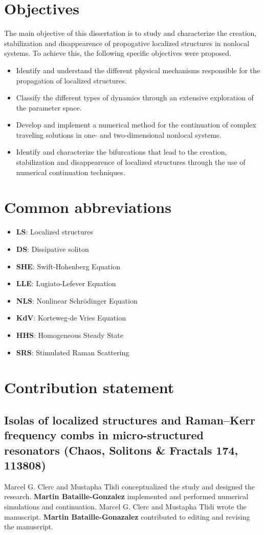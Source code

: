 \section{Objectives}
The main objective of this dissertation is to study and characterize the creation, stabilization and disappearence
of propogative localized structures in nonlocal systems. To achieve this, the following specific objectives were proposed.
\begin{itemize}
  \item Identify and understand the different physical mechanisms responsible for the propagation of
  localized structures.
  \item Classify the different types of dynamics through an extensive exploration of the parameter space.
  \item Develop and implement a numerical method for the continuation of complex traveling solutions in
  one- and two-dimensional nonlocal systems.
  \item Identify and characterize the bifurcations that lead to the creation, stabilization and disappearence 
  of localized structures through the use of numerical continuation techniques.
\end{itemize}

\section{Common abbreviations}

\begin{itemize}
  \item {\bf LS}: Localized structures
  \item {\bf DS}: Dissipative soliton
  \item {\bf SHE}: Swift-Hohenberg Equation
  \item {\bf LLE}: Lugiato-Lefever Equation
  \item {\bf NLS}: Nonlinear Schrödinger Equation
  \item {\bf KdV}: Korteweg-de Vries Equation
  \item {\bf HHS}: Homogeneous Steady State
  \item {\bf SRS}: Stimulated Raman Scattering
\end{itemize}

\section{Contribution statement}

\subsection{Isolas of localized structures and Raman–Kerr frequency combs in micro-structured resonators (Chaos, Solitons \& Fractals 174, 113808)}
Marcel G. Clerc and Mustapha Tlidi conceptualized the study and designed the research. 
{\bf Martin Bataille-Gonzalez} implemented and performed numerical simulations and continuation. 
Marcel G. Clerc and Mustapha Tlidi wrote the manuscript. {\bf Martin Bataille-Gonazalez} 
contributed to editing and revising the manuscript.


